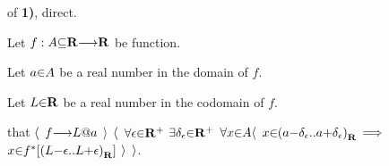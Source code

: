 \vs
{} of {\bf 1)}, direct. \par
Let $f: A\p\subseteq\R \to \R$ be function. \par
Let $a \p\in A$  be a real number in the domain   of $f$. \par
Let $L \p\in \R$ be a real number in the codomain of $f$. \par
{} that $\a\langle$ $f \to L \p@ a$ $\a\rangle$  $\a\langle$ $\a\forall \epsilon \p\in \R^+$ $\a\exists \delta_\epsilon \p\in \R^+$ $\a\forall x \p\in A \a\langle$ $x \p\in \a(a\p-\delta_\epsilon \a{..} a\p+\delta_\epsilon\a)_\R$ $\a\lthen$ $x \p\in f^*[\a(L\p-\epsilon \a{..} L\p+\epsilon\a)_\R]$ $\a\rangle$ $\a\rangle$. \par


